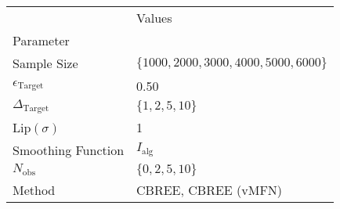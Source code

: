 \begin{tabular}{ll}
 & Values \\
Parameter &  \\
Sample Size & $\{ 1000, 2000, 3000, 4000, 5000, 6000 \}$ \\
\cline{1-2}
$\epsilon_{{\text{{Target}}}}$ & 0.50 \\
\cline{1-2}
$\Delta_{{\text{{Target}}}}$ & $\{ 1, 2, 5, 10 \}$ \\
\cline{1-2}
Lip$(\sigma)$ & 1 \\
\cline{1-2}
Smoothing Function & $I_\text{alg}$ \\
\cline{1-2}
$N_{{ \text{{obs}} }}$ & $\{ 0, 2, 5, 10 \}$ \\
\cline{1-2}
Method & CBREE, CBREE (vMFN) \\
\cline{1-2}
\end{tabular}
